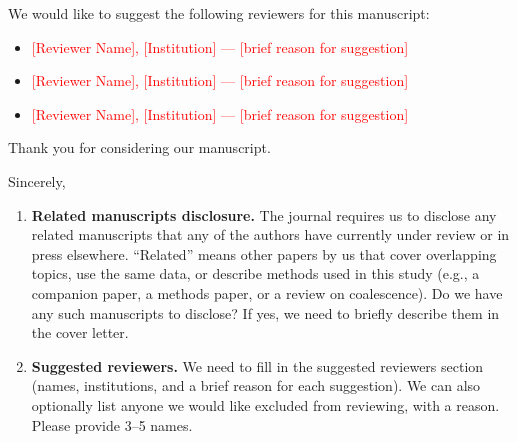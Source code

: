 \documentclass[11pt]{letter}
\begin{document}
\begin{letter}{}
We would like to suggest the following reviewers for this manuscript:
\begin{itemize}
\item \textcolor{red}{[Reviewer Name], [Institution] --- [brief reason for suggestion]}
\item \textcolor{red}{[Reviewer Name], [Institution] --- [brief reason for suggestion]}
\item \textcolor{red}{[Reviewer Name], [Institution] --- [brief reason for suggestion]}
\end{itemize}

Thank you for considering our manuscript.

\closing{Sincerely,}

\end{letter}

\newpage
{}

\begin{enumerate}
\color{red}
\item \textbf{Related manuscripts disclosure.} The journal requires us to disclose any related manuscripts that any of the authors have currently under review or in press elsewhere. ``Related'' means other papers by us that cover overlapping topics, use the same data, or describe methods used in this study (e.g., a companion paper, a methods paper, or a review on coalescence). Do we have any such manuscripts to disclose? If yes, we need to briefly describe them in the cover letter.

\item \textbf{Suggested reviewers.} We need to fill in the suggested reviewers section (names, institutions, and a brief reason for each suggestion). We can also optionally list anyone we would like excluded from reviewing, with a reason. Please provide 3--5 names.
\end{enumerate}
\end{document}
